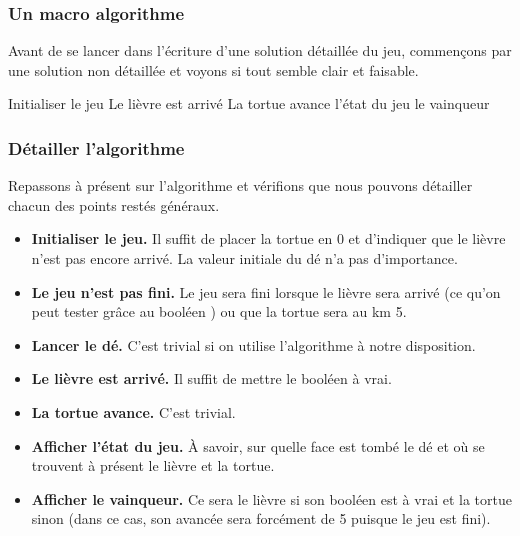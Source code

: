 		\subsubsection*{Un macro algorithme}
				
			Avant de se lancer dans l'écriture d'une solution détaillée du jeu,
			commençons par une solution non détaillée
			et voyons si tout semble clair et faisable.
			
			\begin{LDA}
					\Stmt Initialiser le jeu
							\Stmt Le lièvre est arrivé
						\Else
							\Stmt La tortue avance
						\EndIf
						\Write l'état du jeu
					\EndWhile
					\Write le vainqueur
				\EndAlgo
			\end{LDA}
			
		\subsubsection*{Détailler l'algorithme}
	
			Repassons à présent sur l'algorithme
			et vérifions que nous pouvons détailler 
			chacun des points restés généraux.
			\begin{itemize}
			\item \textbf{Initialiser le jeu.}
				Il suffit de placer la tortue en 0
				et d'indiquer que le lièvre n'est pas encore arrivé.
				La valeur initiale du dé n'a pas d'importance.
			\item \textbf{Le jeu n'est pas fini.}
				Le jeu sera fini lorsque le lièvre sera arrivé
				(ce qu'on peut tester grâce au booléen )
				ou que la tortue sera au km 5.
			\item \textbf{Lancer le dé.}
				C'est trivial si on utilise l'algorithme 
				à notre disposition.
			\item \textbf{Le lièvre est arrivé.}
				Il suffit de mettre le booléen  à vrai.
			\item \textbf{La tortue avance.}
				C'est trivial.
			\item \textbf{Afficher l'état du jeu.}
				À savoir, sur quelle face est tombé le dé
				et où se trouvent à présent le lièvre et la tortue.
			\item \textbf{Afficher le vainqueur.}
				Ce sera le lièvre si son booléen est à vrai et la tortue sinon
				(dans ce cas, son avancée sera forcément de 5 
				puisque le jeu est fini).
			\end{itemize}
			
